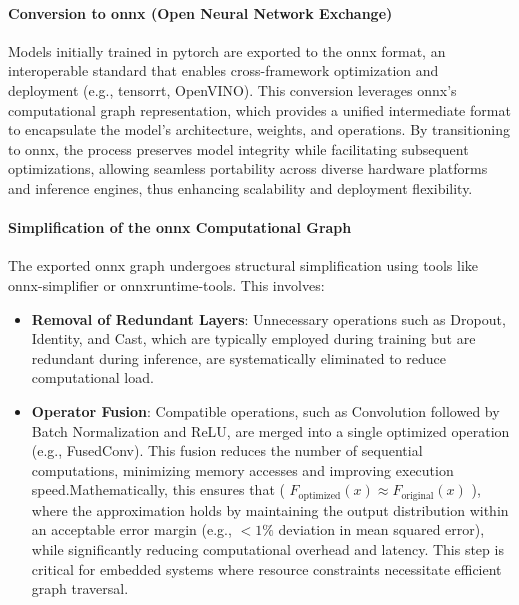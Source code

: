 \documentclass{article}
\begin{document}
\paragraph{Conversion to \acrshort{onnx} (Open Neural Network Exchange)} Models initially trained in \acrshort{pytorch} are exported to the \acrshort{onnx} format, an interoperable standard that enables cross-framework optimization and deployment (e.g., \acrshort{tensorrt}, OpenVINO). This conversion leverages \acrshort{onnx}’s computational graph representation, which provides a unified intermediate format to encapsulate the model’s architecture, weights, and operations. By transitioning to \acrshort{onnx}, the process preserves model integrity while facilitating subsequent optimizations, allowing seamless portability across diverse hardware platforms and inference engines, thus enhancing scalability and deployment flexibility. \paragraph{Simplification of the \acrshort{onnx} Computational Graph} The exported \acrshort{onnx} graph undergoes structural simplification using tools like \acrshort{onnx}-simplifier or onnxruntime-tools. This involves:
\begin{itemize}
    \item \textbf{Removal of Redundant Layers}: Unnecessary operations such as Dropout, Identity, and Cast, which are typically employed during training but are redundant during inference, are systematically eliminated to reduce computational load. \item \textbf{Operator Fusion}: Compatible operations, such as Convolution followed by Batch Normalization and ReLU, are merged into a single optimized operation (e.g., FusedConv). This fusion reduces the number of sequential computations, minimizing memory accesses and improving execution speed.Mathematically, this ensures that ( $F_{\text{optimized}}(x) \approx F_{\text{original}}(x)$ ), where the approximation holds by maintaining the output distribution within an acceptable error margin (e.g., $<1\%$ deviation in mean squared error), while significantly reducing computational overhead and latency. This step is critical for embedded systems where resource constraints necessitate efficient graph traversal. \end{itemize}
\end{document}
